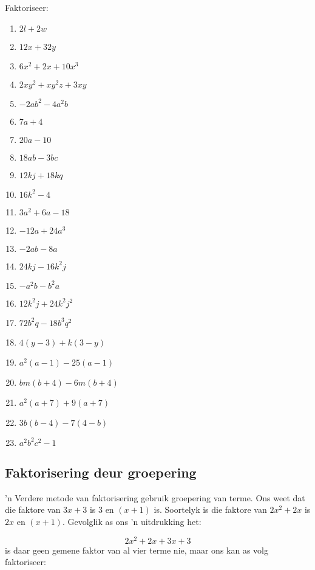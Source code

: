 \begin{exercises}{}
{
Faktoriseer:
\begin{multicols}{2}
\begin{enumerate}[itemsep=5pt, label=\textbf{\arabic*}. ] 
\item $2l+2w$
\item $12x+32y$
\item $6{x}^{2}+2x+10{x}^{3}$
\item $2x{y}^{2}+x{y}^{2}z+3xy$
\item $-2a{b}^{2}-4{a}^{2}b$
\item $7a+4$ 
\item $20a-10$ 
\item $18ab-3bc$
\item $12kj+18kq$ 
\item $16{k}^{2}-4$ 
\item $3{a}^{2}+6a-18$
\item $-12a+24a^3$ 
\item $-2ab-8a$ 
\item $24kj-16{k}^{2}j$
\item $-{a}^{2}b-{b}^{2}a$ 
\item $12{k}^{2}j+24{k}^{2}{j}^{2}$ 
\item $72{b}^{2}q-18{b}^{3}{q}^{2}$
\item $4(y-3)+k(3-y)$ 
\item $a^2(a-1)-25(a-1)$ 
\item $bm(b+4)-6m(b+4)$
\item ${a}^{2}(a+7)+9(a+7)$ 
\item $3b(b-4)-7(4-b)$ 
\item ${a}^{2}{b}^{2}{c}^{2}-1$
\end{enumerate}
\end{multicols}

}
\end{exercises}

\subsection{Faktorisering deur groepering}
\nopagebreak

’n Verdere metode van faktorisering gebruik groepering van terme. Ons weet dat die faktore van $3x+3$ is $3$ en $(x+1)$ is. Soortelyk is die faktore van $2{x}^{2}+2x$ is $2x$ en $(x+1)$. Gevolglik as ons ’n uitdrukking het:

\begin{equation*}
2{x}^{2}+2x+3x+3
\end{equation*}
is daar geen gemene faktor van al vier terme nie, maar ons kan as volg faktoriseer:
\nopagebreak\noindent{}

